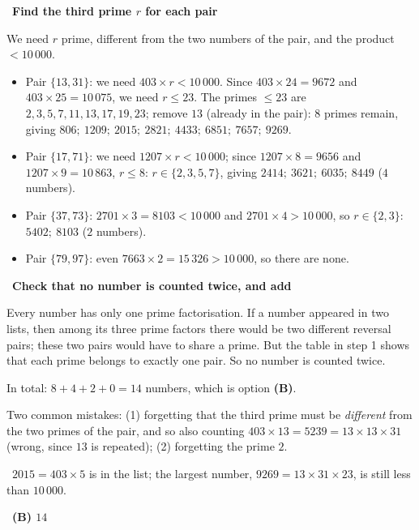 \documentclass[11pt]{article}
\providecommand{\AnsWord}{Đáp số}
\newcommand{\ans}[1]{\par\smallskip{\bfseries\color{tmGreen!88!black}\AnsWord:}\ {\bfseries\color{AnsRed}#1}\par}
\newcommand{\step}[2]{\par\smallskip\noindent{\bfseries\color{tmBlue!85!black}\StepWord~#1.}\ {\bfseries #2}\par\nopagebreak}
\newcommand{\verify}[1]{\par\smallskip\noindent{\bfseries\color{tmGreen!80!black}\faCheckCircle\ \CheckWord}\ #1\par}
\def\AnsWord{Answer}
\def\StepWord{Step}
\def\CheckWord{Check:}
\begin{document}
{\step{3}{Find the third prime $r$ for each pair}
We need $r$ prime, different from the two numbers of the pair, and the product $<10\,000$.
\begin{itemize}[leftmargin=1.2em,itemsep=1pt,topsep=2pt]
\item Pair $\{13,31\}$: we need $403\times r<10\,000$. Since $403\times24=9672$ and $403\times25=10\,075$, we need $r\le23$.
The primes $\le23$ are $2,3,5,7,11,13,17,19,23$; remove $13$ (already in the pair): $8$ primes remain, giving
$806;\ 1209;\ 2015;\ 2821;\ 4433;\ 6851;\ 7657;\ 9269$.
\item Pair $\{17,71\}$: we need $1207\times r<10\,000$; since $1207\times8=9656$ and $1207\times9=10\,863$, $r\le8$:
$r\in\{2,3,5,7\}$, giving $2414;\ 3621;\ 6035;\ 8449$ ($4$ numbers).
\item Pair $\{37,73\}$: $2701\times3=8103<10\,000$ and $2701\times4>10\,000$, so $r\in\{2,3\}$: $5402;\ 8103$ ($2$ numbers).
\item Pair $\{79,97\}$: even $7663\times2=15\,326>10\,000$, so there are none.
\end{itemize}

\step{4}{Check that no number is counted twice, and add}
\begin{proofbox}Every number has only one prime factorisation. If a number appeared in two lists, then among its three prime factors there
would be two different reversal pairs; these two pairs would have to share a prime. But the table in step 1 shows that each prime belongs
to exactly one pair. So no number is counted twice.\end{proofbox}
In total: $8+4+2+0=14$ numbers, which is option \textbf{(B)}.
\begin{warnbox}Two common mistakes: (1) forgetting that the third prime must be \emph{different} from the two primes of the pair, and so
also counting $403\times13=5239=13\times13\times31$ (wrong, since $13$ is repeated); (2) forgetting the prime $2$.\end{warnbox}
\verify{$2015=403\times5$ is in the list; the largest number, $9269=13\times31\times23$, is still less than $10\,000$.}
\ans{(B) $14$}
}
\end{document}
